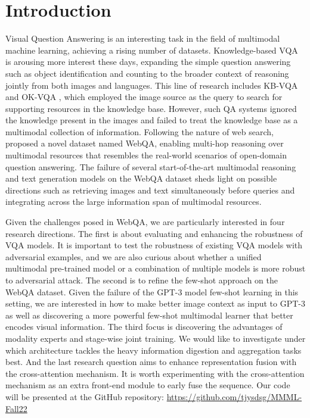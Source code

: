 \documentclass[nohyperref]{article}
\theoremstyle{plain}
\theoremstyle{definition}
\theoremstyle{remark}
\begin{document}
    \section{Introduction}\label{intro}
    Visual Question Answering is an interesting task in the field of multimodal machine learning, achieving a rising number of datasets. Knowledge-based VQA is arousing more interest these days, expanding the simple question answering such as object identification and counting to the broader context of reasoning jointly from both images and languages. This line of research includes KB-VQA \citep{kbvqa} and OK-VQA \citep{okvqa}, which employed the image source as the query to search for supporting resources in the knowledge base. However, such QA systems ignored the knowledge present in the images and failed to treat the knowledge base as a multimodal collection of information. Following the nature of web search, \citet{webqa} proposed a novel dataset named WebQA, enabling multi-hop reasoning over multimodal resources that resembles the real-world scenarios of open-domain question answering. The failure of several start-of-the-art multimodal reasoning and text generation models on the WebQA dataset sheds light on possible directions such as retrieving images and text simultaneously before queries and integrating across the large information span of multimodal resources.

    Given the challenges posed in WebQA, we are particularly interested in four research directions. The first is about evaluating and enhancing the robustness of VQA models. It is important to test the robustness of existing VQA models with adversarial examples, and we are also curious about whether a unified multimodal pre-trained model or a combination of multiple models is more robust to adversarial attack. The second is to refine the few-shot approach on the WebQA dataset. Given the failure of the GPT-3 model few-shot learning in this setting, we are interested in how to make better image context as input to GPT-3 as well as discovering a more powerful few-shot multimodal learner that better encodes visual information. The third focus is discovering the advantages of modality experts and stage-wise joint training. We would like to investigate under which architecture tackles the heavy information digestion and aggregation tasks best. And the last research question aims to enhance representation fusion with the cross-attention mechanism. It is worth experimenting with the cross-attention mechanism as an extra front-end module to early fuse the sequence. Our code will be presented at the GitHub repository: \url{https://github.com/tjysdsg/MMML-Fall22}
\end{document}
